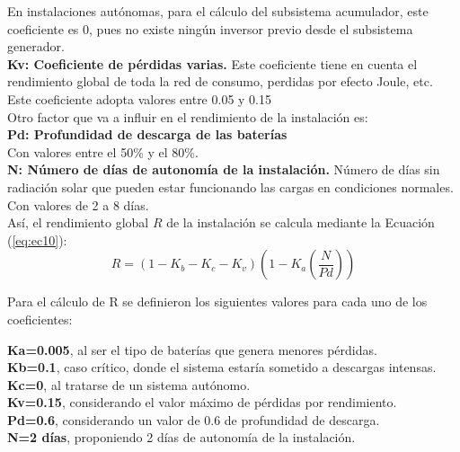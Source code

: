 En instalaciones autónomas, para el cálculo del subsistema acumulador, este coeficiente es 0, pues no existe ningún inversor previo desde el subsistema generador. \\

\textbf{Kv: Coeficiente de pérdidas varias.} Este coeficiente tiene en cuenta el rendimiento global de toda la red de consumo, perdidas por efecto Joule, etc.\\
\hspace*{4em}Este coeficiente adopta valores entre 0.05 y 0.15\\

Otro factor que va a influir en el rendimiento de la instalación es: \\
\textbf{Pd: Profundidad de descarga de las baterías}\\
\hspace*{4em}Con valores entre el 50\%  y el 80\%.\\
\textbf{N: Número de días de autonomía de la instalación.} Número de días sin radiación solar que pueden estar funcionando las cargas en condiciones normales. \\
\hspace*{4em}Con valores de 2 a 8 días. \\

Así, el rendimiento global $R$ de la instalación se calcula mediante la Ecuación (\ref{eq:ec10}):
\begin{equation}\label{eq:ec10}
R = (1-K_{b}-K_{c}-K_{v}) (1-K_{a} (\frac{N}{Pd})) 
\end{equation}

Para el cálculo de R se definieron los siguientes valores para cada uno de los coeficientes: 

\hspace*{2.5em}\textbf{Ka=0.005}, al ser el tipo de baterías que genera menores pérdidas.\\
\hspace*{4em}\textbf{Kb=0.1}, caso crítico, donde el sistema estaría sometido a descargas intensas.\\
\hspace*{4em}\textbf{Kc=0}, al tratarse de un sistema autónomo.\\
\hspace*{4em}\textbf{Kv=0.15}, considerando el valor máximo de pérdidas por rendimiento.\\
\hspace*{4em}\textbf{Pd=0.6}, considerando un valor de 0.6 de profundidad de descarga.\\
\hspace*{4em}\textbf{N=2 días}, proponiendo 2 días de autonomía de la instalación.\\

